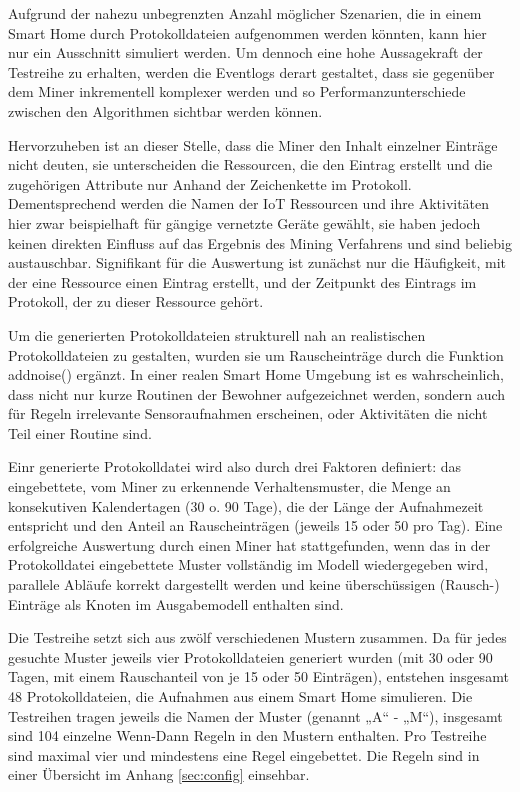 Aufgrund der nahezu unbegrenzten Anzahl möglicher Szenarien, die in einem Smart Home durch Protokolldateien aufgenommen werden könnten, kann hier nur ein Ausschnitt simuliert werden. Um dennoch eine hohe Aussagekraft der Testreihe zu erhalten, werden die Eventlogs derart gestaltet, dass sie gegenüber dem Miner inkrementell komplexer werden und so Performanzunterschiede zwischen den Algorithmen sichtbar werden können. 

Hervorzuheben ist an dieser Stelle, dass die Miner den Inhalt einzelner Einträge nicht deuten, sie unterscheiden die Ressourcen, die den Eintrag erstellt und die zugehörigen Attribute nur Anhand der Zeichenkette im Protokoll. Dementsprechend werden die Namen der IoT Ressourcen und ihre Aktivitäten hier zwar beispielhaft für gängige vernetzte Geräte gewählt, sie haben jedoch keinen direkten Einfluss auf das Ergebnis des Mining Verfahrens und sind beliebig austauschbar. Signifikant für die Auswertung ist zunächst nur die Häufigkeit, mit der eine Ressource einen Eintrag erstellt, und der Zeitpunkt des Eintrags im Protokoll, der zu dieser Ressource gehört.

Um die generierten Protokolldateien strukturell nah an realistischen Protokolldateien zu gestalten, wurden sie um Rauscheinträge durch die Funktion addnoise() ergänzt. In einer realen Smart Home Umgebung ist es wahrscheinlich, dass nicht nur kurze Routinen der Bewohner aufgezeichnet werden, sondern auch für Regeln irrelevante Sensoraufnahmen erscheinen, oder Aktivitäten die nicht Teil einer Routine sind.

Einr generierte Protokolldatei wird also durch drei Faktoren definiert: das eingebettete, vom Miner zu erkennende Verhaltensmuster, die Menge an konsekutiven Kalendertagen (30 o. 90 Tage), die der Länge der Aufnahmezeit entspricht und den Anteil an Rauscheinträgen (jeweils 15 oder 50 pro Tag). Eine erfolgreiche Auswertung durch einen Miner hat stattgefunden, wenn das in der Protokolldatei eingebettete Muster vollständig im Modell wiedergegeben wird, parallele Abläufe korrekt dargestellt werden und keine überschüssigen (Rausch-) Einträge als Knoten im Ausgabemodell enthalten sind.

Die Testreihe setzt sich aus zwölf verschiedenen Mustern zusammen. Da für jedes gesuchte Muster jeweils vier Protokolldateien generiert wurden (mit 30 oder 90 Tagen, mit einem Rauschanteil von je 15 oder 50 Einträgen), entstehen insgesamt 48 Protokolldateien, die Aufnahmen aus einem Smart Home simulieren. Die Testreihen tragen jeweils die Namen der Muster (genannt „A“ - „M“), insgesamt sind 104 einzelne Wenn-Dann Regeln in den Mustern enthalten. Pro Testreihe sind maximal vier und mindestens eine Regel eingebettet. Die Regeln sind in einer Übersicht im Anhang \ref{sec:config} einsehbar. 

